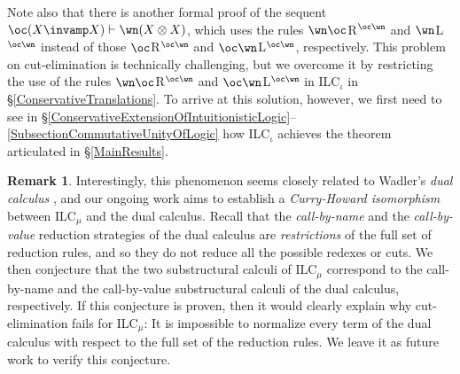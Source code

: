 \documentclass[a4paper]{article}
\theoremstyle{definition}
\newtheorem{remark}[definition]{Remark}
\theoremstyle{theorem}
\theoremstyle{remark}
\begin{document}
Note also that there is another formal proof of the sequent $\oc (X \invamp X) \vdash \wn (X \otimes X)$, which uses the rules $\wn\oc$R$^{\oc\wn}$ and $\wn$L$^{\oc\wn}$ instead of those $\oc$R$^{\oc\wn}$ and $\oc\wn$L$^{\oc\wn}$, respectively.
This problem on cut-elimination is technically challenging, but we overcome it by restricting the use of the rules $\wn \oc$R$^{\oc\wn}$ and $\oc \wn$L$^{\oc\wn}$ in \textsf{ILC}$_\iota$ in \S\ref{ConservativeTranslations}.
To arrive at this solution, however, we first need to see in \S\ref{ConservativeExtensionOfIntuitionisticLogic}--\ref{SubsectionCommutativeUnityOfLogic} how \textsf{ILC}$_\iota$ achieves the theorem articulated in \S\ref{MainResults}.

\begin{remark}
Interestingly, this phenomenon seems closely related to Wadler's \emph{dual calculus} \cite{wadler2003call,tzevelekos2006investigations}, and our ongoing work aims to establish a \emph{Curry-Howard isomorphism} \cite{sorensen2006lectures} between \textsf{ILC}$_\mu$ and the dual calculus.
Recall that the \emph{call-by-name} and the \emph{call-by-value} reduction strategies of the dual calculus are \emph{restrictions} of the full set of reduction rules, and so they do not reduce all the possible redexes or cuts.
We then conjecture that the two substructural calculi of \textsf{ILC}$_\mu$ correspond to the call-by-name and the call-by-value substructural calculi of the dual calculus, respectively.
If this conjecture is proven, then it would clearly explain why cut-elimination fails for \textsf{ILC}$_\mu$: It is impossible to normalize every term of the dual calculus with respect to the full set of the reduction rules.
We leave it as future work to verify this conjecture.
\end{remark}
\fi
\end{document}
